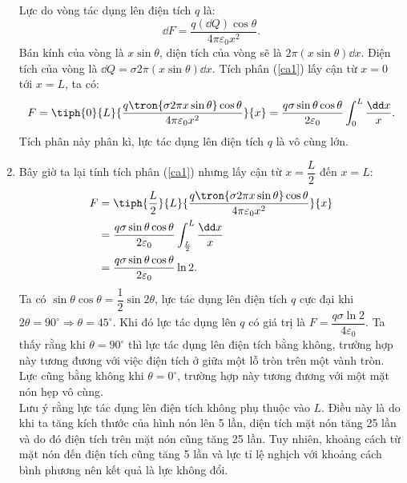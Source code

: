 \begin{loigiai}
\begin{enumerate}[1)]
\begin{center}
            \end{center}
            Lực do vòng tác dụng lên điện tích $q$ là:
            \[\dd F=\dfrac{q(\dd Q)\cos\theta}{4\pi \varepsilon_0 x^2}. \tag{1}  \label{ca1}\]
            Bán kính của vòng là $x\sin\theta$, diện tích của vòng sẽ là $2\pi(x\sin\theta) \dd x $. Điện tích của vòng là $\dd Q=\sigma 2\pi(x\sin\theta) \dd x$. Tích phân (\ref{ca1}) lấy cận từ $x=0$ tới $x=L$, ta có:
            \begin{equation*}
                F=\tiph{0}{L}{\dfrac{q\tron{\sigma 2\pi x\sin\theta}\cos\theta}{4\pi \varepsilon_0 x^2}}{x}=\dfrac{q\sigma \sin\theta\cos\theta}{2\varepsilon_0}\int_0^L\dfrac{\dd x}{x}.
            \end{equation*}
            Tích phân này phân kì, lực tác dụng lên điện tích $q$ là vô cùng lớn. 
            \item Bây giờ ta lại tính tích phân (\ref{ca1}) nhưng lấy cận từ $x=\dfrac{L}{2}$ đến $x=L$:
            \begin{equation*}
            \begin{aligned}
               F&=\tiph{\frac{L}{2}}{L}{\dfrac{q\tron{\sigma 2\pi x\sin\theta}\cos\theta}{4\pi \varepsilon_0 x^2}}{x}\\
               &=\dfrac{q\sigma \sin\theta\cos\theta}{2\varepsilon_0}\int_\frac{L}{2}^L\dfrac{\dd x}{x}\\
               &=\dfrac{q\sigma \sin\theta\cos\theta}{2\varepsilon_0}\ln 2.
            \end{aligned}
            \end{equation*}
            Ta có $\sin \theta \cos \theta=\dfrac{1}{2}\sin2\theta$, lực tác dụng lên điện tích $q$ cực đại khi $2\theta=90^\circ\Rightarrow\theta=45^\circ$. Khi đó lực tác dụng lên $q$ có giá trị là $F=\dfrac{q\sigma\ln 2}{4\varepsilon_0}$. Ta thấy rằng khi $\theta=90^\circ$ thì lực tác dụng lên điện tích bằng không, trường hợp này tương đương với việc điện tích ở giữa một lỗ tròn trên một vành tròn. Lực cũng bằng không khi $\theta=0^\circ$, trường hợp này tương đương với một mặt nón hẹp vô cùng. \\
            Lưu ý rằng lực tác dụng lên điện tích không phụ thuộc vào $L$. Điều này là do khi ta tăng kích thước của hình nón lên 5 lần, diện tích mặt nón tăng 25 lần và do đó điện tích trên mặt nón cũng tăng 25 lần. Tuy nhiên, khoảng cách từ mặt nón đến điện tích cũng tăng 5 lần và lực tỉ lệ nghịch với khoảng cách bình phương nên kết quả là lực không đổi.
        \end{enumerate}
    \end{loigiai}
    \renewcommand{\theequation}{\arabic{equation}}
    
